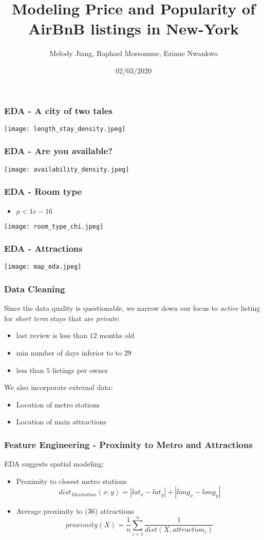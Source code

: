 \documentclass{beamer}
\title{Modeling Price and Popularity of AirBnB listings in New-York}
\author{Melody Jiang, Raphael Morsomme, Ezinne Nwankwo}
\institute{Department of Statistical Science, Duke University}
\date{02/03/2020}
\begin{document}
\frame{\titlepage}







\begin{frame}
    \frametitle{EDA - A city of two tales}

    
    \texttt{[image: length\_stay\_density.jpeg]}
\end{frame}


\begin{frame}
    \frametitle{EDA - Are you available?}
    \texttt{[image: availability\_density.jpeg]}
\end{frame}

\begin{frame}
    \frametitle{EDA - Room type}
    \begin{itemize}
        \item $p < 1e-16$
    \end{itemize}
    \centering
    \texttt{[image: room\_type\_chi.jpeg]}

\end{frame}

\begin{frame}
    \frametitle{EDA - Attractions}
    \texttt{[image: map\_eda.jpeg]}
\end{frame}


\begin{frame}
\frametitle{Data Cleaning}
Since the data quality is questionable, we narrow down our focus to \textit{active} listing for \textit{short term} stays that are \textit{private}:

\begin{itemize}
	\item last review is less than $12$ months old
	\item min number of days inferior to to $29$
	\item less than $5$ listings per owner
\end{itemize}

We also incorporate external data:
\begin{itemize}
	\item Location of metro stations
	\item Location of main attractions
\end{itemize}
\end{frame}



\begin{frame}
\frametitle{Feature Engineering - Proximity to Metro and Attractions}
EDA suggests spatial modeling:
\begin{itemize}
	\item Proximity to closest metro stations
	$$dist_{Manhattan}(x, y) = |lat_{x} - lat_{y}| +  |long_{x} - long_{y}|$$
	\item Average proximity to ($36$) attractions
	$$proximity(X) = \dfrac{1}{n}\sum_{i=1}^{n} \dfrac{1}{dist(X, attraction_i)}
	$$
\end{itemize}
\end{frame}
\end{document}
